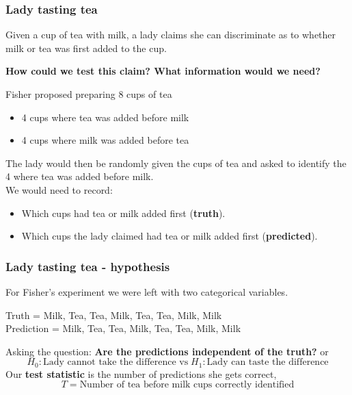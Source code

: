 \documentclass[a4paper]{article}\usepackage[]{graphicx}\usepackage[]{xcolor}
\begin{document}
\subsubsection{Lady tasting tea}
Given a cup of tea with milk, a lady claims she can discriminate as to whether milk or tea was first added to the cup.
\begin{greenbox}
	\textbf{How could we test this claim? What information would we need?}
\end{greenbox}
Fisher proposed preparing 8 cups of tea
\begin{itemize}
	\item 4 cups where tea was added before milk
	\item 4 cups where milk was added before tea
\end{itemize}
The lady would then be randomly given the cups of tea and asked to identify the 4 where tea was added before milk.\\
We would need to record:
\begin{itemize}
	\item Which cups had tea or milk added first (\textbf{truth}).
	\item Which cups the lady claimed had tea or milk added first (\textbf{predicted}).
\end{itemize}
\subsubsection{Lady tasting tea - hypothesis}
For Fisher's experiment we were left with two categorical variables.
\begin{center}
	Truth = Milk, Tea, Tea, Milk, Tea, Tea, Milk, Milk\\
	Prediction = Milk, Tea, Tea, Milk, Tea, Tea, Milk, Milk
\end{center}
Asking the question: \textbf{Are the predictions independent of the truth?} or
\[
	H_0: \text{Lady cannot take the difference vs}\; H_1: \text{Lady can taste the difference}
\]
Our \textbf{test statistic} is the number of predictions she gets correct,
\[
	T = \text{Number of tea before milk cups correctly identified}
\]
\end{document}
